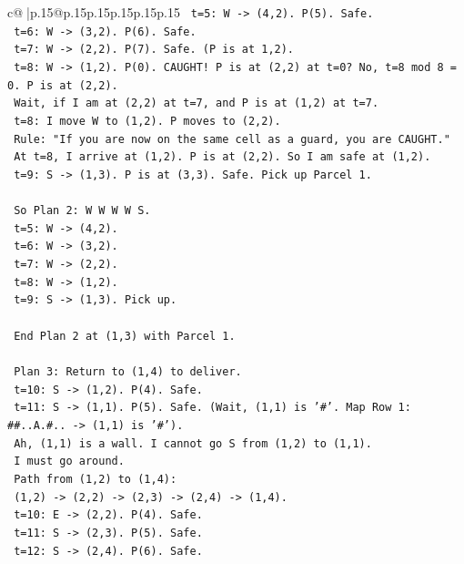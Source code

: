 \documentclass{article}
\begin{document}
{\begin{supertabular}{c@{$\;$}|p{.15\linewidth}@{}p{.15\linewidth}p{.15\linewidth}p{.15\linewidth}p{.15\linewidth}p{.15\linewidth}}
{{{\texttt{   t=5: W {-}> (4,2). P(5). Safe.} \\
\texttt{   t=6: W {-}> (3,2). P(6). Safe.} \\
\texttt{   t=7: W {-}> (2,2). P(7). Safe. (P is at 1,2).} \\
\texttt{   t=8: W {-}> (1,2). P(0). CAUGHT! P is at (2,2) at t=0? No, t=8 mod 8 = 0. P is at (2,2).} \\
\texttt{   Wait, if I am at (2,2) at t=7, and P is at (1,2) at t=7.} \\
\texttt{   t=8: I move W to (1,2). P moves to (2,2).} \\
\texttt{   Rule: "If you are now on the same cell as a guard, you are CAUGHT."} \\
\texttt{   At t=8, I arrive at (1,2). P is at (2,2). So I am safe at (1,2).} \\
\texttt{   t=9: S {-}> (1,3). P is at (3,3). Safe. Pick up Parcel 1.} \\
\\ 
\texttt{   So Plan 2: W W W W S.} \\
\texttt{   t=5: W {-}> (4,2).} \\
\texttt{   t=6: W {-}> (3,2).} \\
\texttt{   t=7: W {-}> (2,2).} \\
\texttt{   t=8: W {-}> (1,2).} \\
\texttt{   t=9: S {-}> (1,3). Pick up.} \\
\\ 
\texttt{   End Plan 2 at (1,3) with Parcel 1.} \\
\\ 
\texttt{   Plan 3: Return to (1,4) to deliver.} \\
\texttt{   t=10: S {-}> (1,2). P(4). Safe.} \\
\texttt{   t=11: S {-}> (1,1). P(5). Safe. (Wait, (1,1) is '\#'. Map Row 1: \#\#..A.\#.. {-}> (1,1) is '\#').} \\
\texttt{   Ah, (1,1) is a wall. I cannot go S from (1,2) to (1,1).} \\
\texttt{   I must go around.} \\
\texttt{   Path from (1,2) to (1,4):} \\
\texttt{   (1,2) {-}> (2,2) {-}> (2,3) {-}> (2,4) {-}> (1,4).} \\
\texttt{   t=10: E {-}> (2,2). P(4). Safe.} \\
\texttt{   t=11: S {-}> (2,3). P(5). Safe.} \\
\texttt{   t=12: S {-}> (2,4). P(6). Safe.} \\
}}}
\end{supertabular}}
\end{document}
